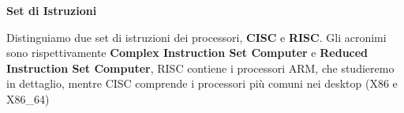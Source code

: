 


\begin{defn}
	\textbf{Set di Istruzioni}

	Distinguiamo due set di istruzioni dei processori, \textbf{CISC} e \textbf{RISC}. Gli acronimi sono rispettivamente \textbf{Complex Instruction Set Computer} e \textbf{Reduced Instruction Set Computer}, RISC contiene i processori ARM, che studieremo in dettaglio, mentre CISC comprende i processori più comuni nei desktop (X86 e X86\_64)
\end{defn}

